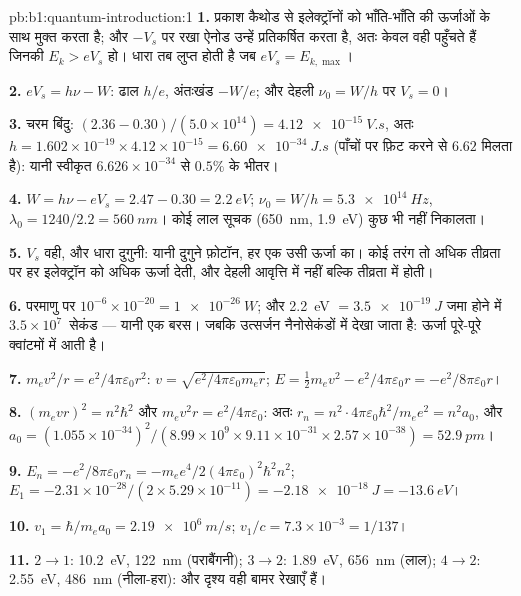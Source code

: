 \begin{solution}{pb:b1:quantum-introduction:1}
\textbf{1.} प्रकाश कैथोड से इलेक्ट्रॉनों को भाँति-भाँति की ऊर्जाओं के साथ
मुक्त करता है; और $-V_s$ पर रखा ऐनोड उन्हें प्रतिकर्षित करता है, अतः केवल
वही पहुँचते हैं जिनकी $E_k > eV_s$ हो। धारा तब लुप्त होती है जब $eV_s = E_{k,\max}$।

\textbf{2.} $eV_s = h\nu - W$: ढाल $h/e$, अंतःखंड $-W/e$;
और देहली $\nu_0 = W/h$ पर $V_s = 0$।

\textbf{3.} चरम बिंदु: $(2.36 - 0.30)/(5.0 \times 10^{14}) = \qty{4.12e-15}{V.s}$,
अतः $h = 1.602 \times 10^{-19} \times 4.12 \times 10^{-15} = \qty{6.60e-34}{J.s}$ (पाँचों
पर फ़िट करने से $6.62$ मिलता है): यानी स्वीकृत $6.626 \times 10^{-34}$ से
$0.5\%$ के भीतर।

\textbf{4.} $W = h\nu - eV_s = 2.47 - 0.30 = \qty{2.2}{eV}$; $\nu_0 = W/h =
\qty{5.3e14}{Hz}$, $\lambda_0 = 1240/2.2 = \qty{560}{nm}$। कोई लाल सूचक
(\qty{650}{nm}, \qty{1.9}{eV}) कुछ भी नहीं निकालता।

\textbf{5.} $V_s$ वही, और धारा दुगुनी: यानी दुगुने फ़ोटॉन, हर एक उसी ऊर्जा
का। कोई तरंग तो अधिक तीव्रता पर हर इलेक्ट्रॉन को अधिक ऊर्जा देती, और देहली
आवृत्ति में नहीं बल्कि तीव्रता में होती।

\textbf{6.} परमाणु पर $10^{-6} \times 10^{-20} = \qty{1e-26}{W}$; और \qty{2.2}{eV} $=
\qty{3.5e-19}{J}$ जमा होने में $3.5 \times 10^7$~सेकंड --- यानी एक बरस। जबकि
उत्सर्जन नैनोसेकंडों में देखा जाता है: ऊर्जा पूरे-पूरे क्वांटमों में आती है।

\textbf{7.} $m_ev^2/r = e^2/4\pi\varepsilon_0r^2$: $v = \sqrt{e^2/4\pi\varepsilon_0m_er}$; $E =
\tfrac12m_ev^2 - e^2/4\pi\varepsilon_0r = -e^2/8\pi\varepsilon_0r$।

\textbf{8.} $(m_evr)^2 = n^2\hbar^2$ और $m_ev^2r = e^2/4\pi\varepsilon_0$: अतः $r_n = n^2 \cdot
4\pi\varepsilon_0\hbar^2/m_ee^2 = n^2a_0$, और $a_0 = (1.055 \times 10^{-34})^2/(8.99 \times 10^9
\times 9.11 \times 10^{-31} \times 2.57 \times 10^{-38}) = \qty{52.9}{pm}$।

\textbf{9.} $E_n = -e^2/8\pi\varepsilon_0r_n = -m_ee^4/2(4\pi\varepsilon_0)^2\hbar^2n^2$; $E_1 =
-2.31 \times 10^{-28}/(2 \times 5.29 \times 10^{-11}) = \qty{-2.18e-18}{J} = \qty{-13.6}{eV}$।

\textbf{10.} $v_1 = \hbar/m_ea_0 = \qty{2.19e6}{m/s}$; $v_1/c = 7.3 \times 10^{-3} =
1/137$।

\textbf{11.} $2 \to 1$: \qty{10.2}{eV}, \qty{122}{nm} (पराबैंगनी); $3 \to 2$:
\qty{1.89}{eV}, \qty{656}{nm} (लाल); $4 \to 2$: \qty{2.55}{eV}, \qty{486}{nm}
(नीला-हरा): और दृश्य वही बामर रेखाएँ हैं।


\end{solution}
